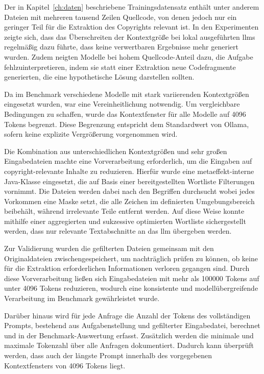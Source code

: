Der in Kapitel~\ref{ch:daten} beschriebene Trainingsdatensatz enthält unter anderem Dateien mit mehreren tausend Zeilen Quellcode, von denen jedoch nur ein geringer Teil für die Extraktion des Copyrights relevant ist.
In den Experimenten zeigte sich, dass das Überschreiten der Kontextgröße bei lokal ausgeführten \glspl{llm} regelmäßig dazu führte, dass keine verwertbaren Ergebnisse mehr generiert wurden.
Zudem neigten Modelle bei hohem Quellcode-Anteil dazu, die Aufgabe fehlzuinterpretieren, indem sie statt einer Extraktion neue Codefragmente generierten, die eine hypothetische Lösung darstellen sollten.

Da im Benchmark verschiedene Modelle mit stark variierenden Kontextgrößen eingesetzt wurden, war eine Vereinheitlichung notwendig.
Um vergleichbare Bedingungen zu schaffen, wurde das Kontextfenster für alle Modelle auf \num{4096} Tokens begrenzt.
Diese Begrenzung entspricht dem Standardwert von Ollama, sofern keine explizite Vergrößerung vorgenommen wird.

Die Kombination aus unterschiedlichen Kontextgrößen und sehr großen Eingabedateien machte eine Vorverarbeitung erforderlich, um die Eingaben auf copyright-relevante Inhalte zu reduzieren.
Hierfür wurde eine metaeffekt-interne Java-Klasse eingesetzt, die auf Basis einer bereitgestellten Wortliste Filterungen vornimmt.
Die Dateien werden dabei nach den Begriffen durchsucht wobei jedes Vorkommen eine Maske setzt, die alle Zeichen im definierten Umgebungsbereich beibehält, während irrelevante Teile entfernt werden.
Auf diese Weise konnte mithilfe einer aggregierten und sukzessive optimierten Wortliste sichergestellt werden, dass nur relevante Textabschnitte an das \gls{llm} übergeben werden.

Zur Validierung wurden die gefilterten Dateien gemeinsam mit den Originaldateien zwischengespeichert, um nachträglich prüfen zu können, ob keine für die Extraktion erforderlichen Informationen verloren gegangen sind.
Durch diese Vorverarbeitung ließen sich Eingabedateien mit mehr als \num{100000} Tokens auf unter \num{4096} Tokens reduzieren, wodurch eine konsistente und modellübergreifende Verarbeitung im Benchmark gewährleistet wurde.

Darüber hinaus wird für jede Anfrage die Anzahl der Tokens des vollständigen Prompts, bestehend aus Aufgabenstellung und gefilterter Eingabedatei, berechnet und in der Benchmark-Auswertung erfasst.
Zusätzlich werden die minimale und maximale Tokenzahl über alle Anfragen dokumentiert.
Dadurch kann überprüft werden, dass auch der längste Prompt innerhalb des vorgegebenen Kontextfensters von \num{4096} Tokens liegt.

